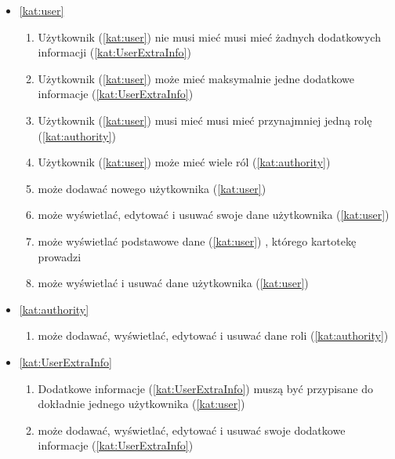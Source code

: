 \begin{itemize}[label={\textbf{Reguły dla}}, wide, labelwidth=!, labelindent=0pt]
    \setlength\itemsep{1em}
    \item\ref{kat:user}
    \begin{enumerate}[label={\textbf{REG/\protect\threedigits{\arabic{enumi}}}}, wide, labelwidth=!, align=left, leftmargin=3cm]
        \item Użytkownik (\ref{kat:user}) nie musi mieć musi mieć żadnych dodatkowych informacji (\ref{kat:UserExtraInfo})
        \item Użytkownik (\ref{kat:user}) może mieć maksymalnie jedne dodatkowe informacje (\ref{kat:UserExtraInfo})
        \item Użytkownik (\ref{kat:user}) musi mieć musi mieć przynajmniej jedną rolę (\ref{kat:authority})
        \item Użytkownik (\ref{kat:user}) może mieć wiele ról (\ref{kat:authority})
        \item {} może dodawać nowego użytkownika (\ref{kat:user})
        \item {} może wyświetlać, edytować i usuwać swoje dane użytkownika (\ref{kat:user})
        \item {} może wyświetlać podstawowe dane (\ref{kat:user}) , którego kartotekę prowadzi
        \item {} może wyświetlać i usuwać dane użytkownika (\ref{kat:user})
    \end{enumerate}
    \item\ref{kat:authority}
    \begin{enumerate}[label={\textbf{REG/\protect\threedigits{\arabic{enumi}}}}, wide, labelwidth=!, align=left, leftmargin=3cm, resume]
        \item {} może dodawać, wyświetlać, edytować i usuwać dane roli (\ref{kat:authority})
    \end{enumerate}
    \item\ref{kat:UserExtraInfo}
    \begin{enumerate}[label={\textbf{REG/\protect\threedigits{\arabic{enumi}}}}, wide, labelwidth=!, align=left, leftmargin=3cm, resume]
        \item Dodatkowe informacje (\ref{kat:UserExtraInfo}) muszą być przypisane do dokładnie jednego użytkownika (\ref{kat:user})
        \item {} może dodawać, wyświetlać, edytować i usuwać swoje dodatkowe informacje (\ref{kat:UserExtraInfo})

\end{enumerate}
\end{itemize}
